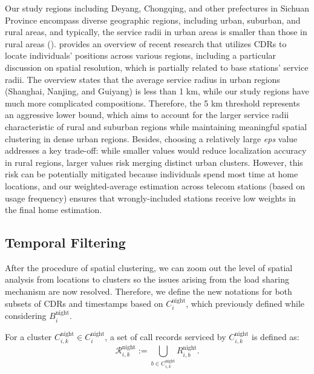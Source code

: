 Our study regions including Deyang, Chongqing, and other prefectures in Sichuan Province encompass diverse geographic regions, including urban, suburban, and rural areas, and typically, the service radii in urban areas is smaller than those in rural areas (\cite{zreikat2004comparative}).
\cite{zhou2024cell} provides an overview of recent research that utilizes CDRs to locate individuals' positions across various regions, including a particular discussion on spatial resolution, which is partially related to base stations' service radii.
The overview states that the average service radius in urban regions (Shanghai, Nanjing, and Guiyang) is less than 1 km, while our study regions have much more complicated compositions.
Therefore, the 5 km threshold represents an aggressive lower bound, which aims to account for the larger service radii characteristic of rural and suburban regions while maintaining meaningful spatial clustering in dense urban regions.
Besides, choosing a relatively large \textit{eps} value addresses a key trade-off: while smaller values would reduce localization accuracy in rural regions, larger values risk merging distinct urban clusters.
However, this risk can be potentially mitigated because individuals spend most time at home locations, and our weighted-average estimation across telecom stations (based on usage frequency) ensures that wrongly-included stations receive low weights in the final home estimation.


\subsection{Temporal Filtering}\label{sec:temporal_filtering}
After the procedure of spatial clustering, we can zoom out the level of spatial analysis from locations to clusters so the issues arising from the load sharing mechanism are now resolved. Therefore, we define the new notations for both subsets of CDRs and timestamps based on $C^\text{night}_i$, which previously defined while considering $B^\text{night}_i$.


\begin{definition}
For a cluster $C^{\text{night}}_{i, k} \in C^{\text{night}}_i$, a set of call records serviced by $C^{\text{night}}_{i, k}$ is defined as:
$$
\mathcal{R}^{\text{night}}_{i, k} := \bigcup_{b \in C^{\text{night}}_{i, k}} R^{\text{night}}_{i, b}.
$$
\end{definition}


